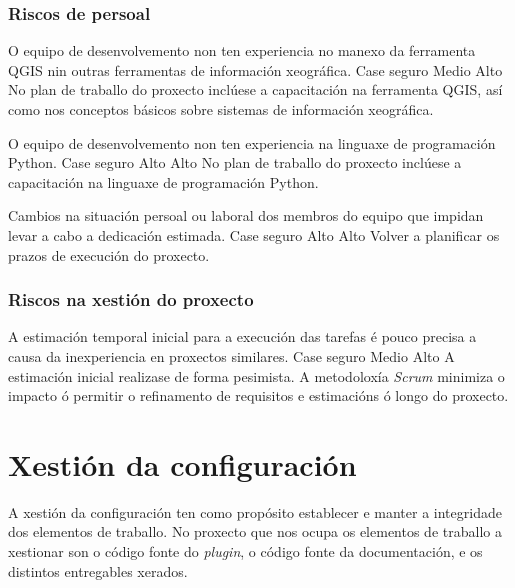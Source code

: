 \subsubsection{Riscos de persoal}
		  	{O equipo de desenvolvemento non ten experiencia no manexo da ferramenta QGIS nin outras ferramentas de información xeográfica.}
			{Case seguro} %
			{Medio} %
			{Alto} %
			{No plan de traballo do proxecto inclúese a capacitación na ferramenta QGIS, así como nos conceptos básicos sobre sistemas de información xeográfica.}

		  	{O equipo de desenvolvemento non ten experiencia na linguaxe de programación Python.}
			{Case seguro} %
			{Alto} %
			{Alto} %
			{No plan de traballo do proxecto inclúese a capacitación na linguaxe de programación Python.}
			
		  	{Cambios na situación persoal ou laboral dos membros do equipo que impidan levar a cabo a dedicación estimada.}
			{Case seguro} %
			{Alto} %
			{Alto} %
			{Volver a planificar os prazos de execución do proxecto.}
			
\subsubsection{Riscos na xestión do proxecto}
		  	{A estimación temporal inicial para a execución das tarefas é pouco precisa a causa da inexperiencia en proxectos similares.}
			{Case seguro} %
			{Medio} %
			{Alto} %
			{A estimación inicial realizase de forma pesimista. A metodoloxía \emph{Scrum} minimiza o impacto ó permitir o refinamento de requisitos e estimacións ó longo do proxecto.}

\section{Xestión da configuración}
A xestión da configuración\cite{GPGC} ten como propósito establecer e manter a integridade dos elementos de traballo. No proxecto que nos ocupa os elementos de traballo a xestionar son o código fonte do \emph{plugin}, o código fonte da documentación, e os distintos entregables xerados.

